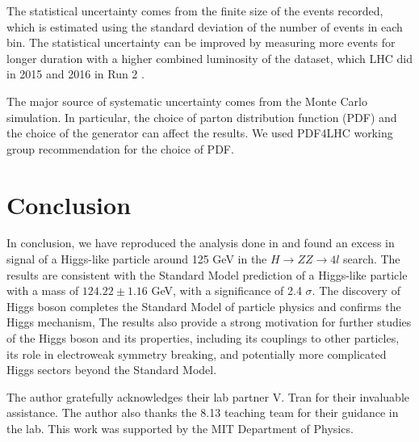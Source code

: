 The statistical uncertainty comes from the finite size of the events recorded, which is estimated using the standard deviation of the number of events in each bin. The statistical uncertainty can be improved by measuring more events for longer duration with a higher combined luminosity of the dataset, which LHC did in 2015 and 2016 in Run 2 \cite{ATLAS:2023oaq}. 

The major source of systematic uncertainty comes from the Monte Carlo simulation. In particular, the choice of parton distribution function (PDF) and the choice of the generator can affect the results. We used \textsc{PDF4LHC} working group recommendation \cite{Botje:2011sn,Alekhin:2011sk,Lai:2010vv,Ball:2011mu} for the choice of PDF. 

\section{Conclusion}
In conclusion, we have reproduced the analysis done in \cite{CMS:2012qbp} and found an excess in signal of a Higgs-like particle around 125 GeV in the $H \to ZZ \to 4l$ search. The results are consistent with the Standard Model prediction of a Higgs-like particle with a mass of $124.22\pm1.16$ GeV, with a significance of 2.4 $\sigma$. The discovery of Higgs boson completes the Standard Model of particle physics and confirms the Higgs mechanism, The results also provide a strong motivation for further studies of the Higgs boson and its properties, including its couplings to other particles, its role in electroweak symmetry breaking, and potentially more complicated Higgs sectors beyond the Standard Model.

\vfill\null

\begin{acknowledgments} The author gratefully acknowledges their lab partner V. Tran for their invaluable assistance. The author also thanks the 8.13 teaching team for their guidance in the lab. This work was supported by the MIT Department of Physics. 
\end{acknowledgments}





